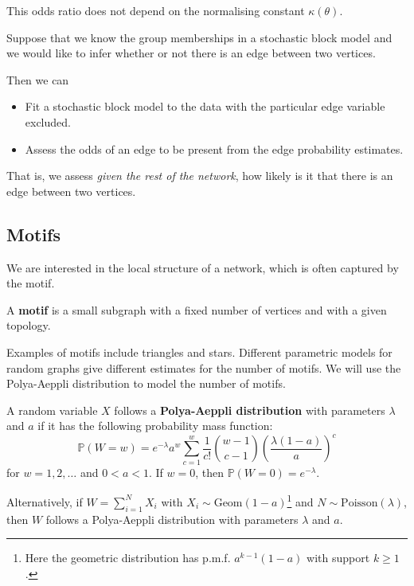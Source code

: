 \documentclass{article}
\begin{document}
This odds ratio does not depend on the normalising constant $\kappa(\theta)$.

\begin{example}
Suppose that we know the group memberships in a stochastic block model and we would like to infer whether or not there is an edge between two vertices.  

Then we can
\begin{itemize}
    \item Fit a stochastic block model to the data with the particular edge variable excluded.
    \item Assess the odds of an edge to be present from the edge probability estimates.
\end{itemize}

That is, we assess \textit{given the rest of the network}, how likely is it that there is an edge between two vertices.  
\end{example}



\subsection{Motifs}

We are interested in the local structure of a network, which is often captured by the motif.
\begin{definition}
    A \textbf{motif} is a small subgraph with a fixed number of vertices and with
    a given topology.
\end{definition}

Examples of motifs include triangles and stars. Different parametric models for random graphs give different estimates for the number of motifs. We will use the Polya-Aeppli distribution to model the number of motifs.  

\begin{definition}
    A random variable $X$ follows a \textbf{Polya-Aeppli distribution} with parameters $\lambda$ and $a$ if it has the following probability mass function:
    \begin{equation*}
        \mathbb{P}(W=w)=e^{-\lambda}a^{w}\sum_{c=1}^{w}\frac{1}{c!}\binom{w-1}{c-1}\left(\frac{\lambda(1-a)}{a}\right)^{c}
    \end{equation*}
    for $w=1,2,\ldots$ and $0<a<1$. If $w=0$, then $\mathbb{P}(W=0)=e^{-\lambda}$.
\end{definition}

Alternatively, if $W=\sum_{i=1}^{N}X_{i}$ with $X_{i}\sim\mathrm{Geom}(1-a)$\footnote{Here the geometric distribution has p.m.f. $a^{k-1}(1-a)$ with support $k\geq 1$. } and $N\sim \mathrm{Poisson}(\lambda)$, then $W$ follows a Polya-Aeppli distribution with parameters $\lambda$ and $a$.  
\end{document}
